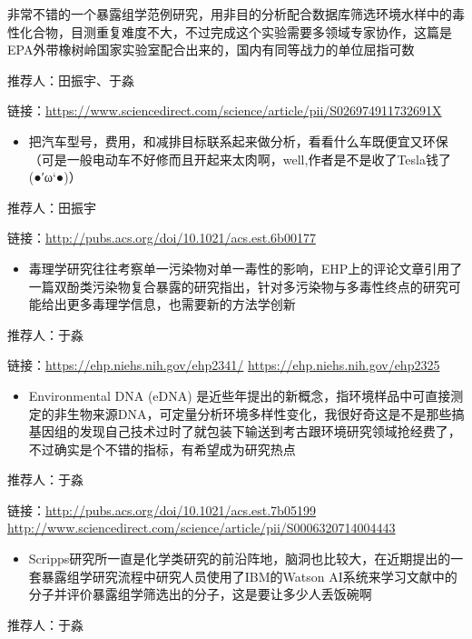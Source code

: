 \documentclass[]{book}
\providecommand{\tightlist}{%
  \setlength{\itemsep}{0pt}\setlength{\parskip}{0pt}}
\begin{document}
非常不错的一个暴露组学范例研究，用非目的分析配合数据库筛选环境水样中的毒性化合物，目测重复难度不大，不过完成这个实验需要多领域专家协作，这篇是EPA外带橡树岭国家实验室配合出来的，国内有同等战力的单位屈指可数

推荐人：田振宇、于淼

链接：\url{https://www.sciencedirect.com/science/article/pii/S026974911732691X}

\begin{itemize}
\tightlist
\item
  把汽车型号，费用，和减排目标联系起来做分析，看看什么车既便宜又环保（可是一般电动车不好修而且开起来太肉啊，well,作者是不是收了Tesla钱了 (●′ω`●)）
\end{itemize}

推荐人：田振宇

链接：\url{http://pubs.acs.org/doi/10.1021/acs.est.6b00177}

\begin{itemize}
\tightlist
\item
  毒理学研究往往考察单一污染物对单一毒性的影响，EHP上的评论文章引用了一篇双酚类污染物复合暴露的研究指出，针对多污染物与多毒性终点的研究可能给出更多毒理学信息，也需要新的方法学创新
\end{itemize}

推荐人：于淼

链接：\url{https://ehp.niehs.nih.gov/ehp2341/} \url{https://ehp.niehs.nih.gov/ehp2325}

\begin{itemize}
\tightlist
\item
  Environmental DNA (eDNA) 是近些年提出的新概念，指环境样品中可直接测定的非生物来源DNA，可定量分析环境多样性变化，我很好奇这是不是那些搞基因组的发现自己技术过时了就包装下输送到考古跟环境研究领域抢经费了，不过确实是个不错的指标，有希望成为研究热点
\end{itemize}

推荐人：于淼

链接：\url{http://pubs.acs.org/doi/10.1021/acs.est.7b05199} \url{http://www.sciencedirect.com/science/article/pii/S0006320714004443}

\begin{itemize}
\tightlist
\item
  Scripps研究所一直是化学类研究的前沿阵地，脑洞也比较大，在近期提出的一套暴露组学研究流程中研究人员使用了IBM的Watson AI系统来学习文献中的分子并评价暴露组学筛选出的分子，这是要让多少人丢饭碗啊
\end{itemize}

推荐人：于淼
\end{document}
